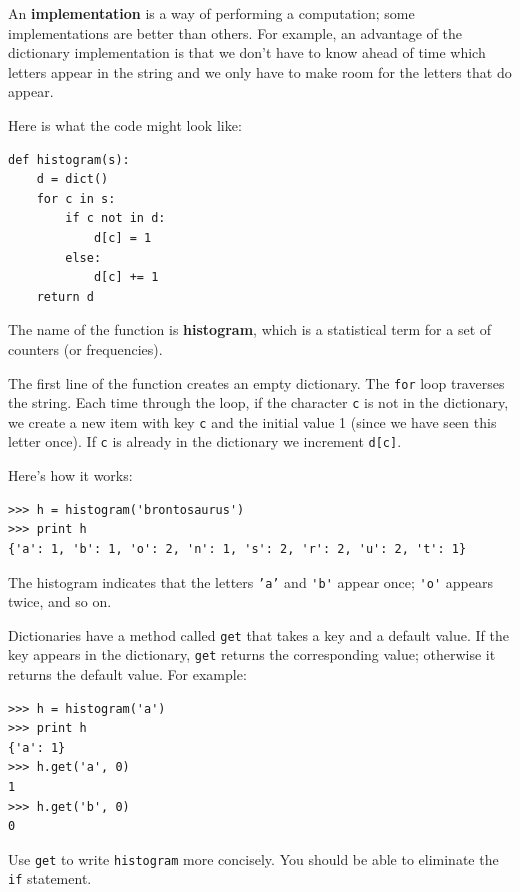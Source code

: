 \documentclass[10pt]{book}
\begin{document}
An {\bf implementation} is a way of performing a computation;
some implementations are better than others.  For example,
an advantage of the dictionary implementation is that we don't
have to know ahead of time which letters appear in the string
and we only have to make room for the letters that do appear.

Here is what the code might look like:

\beforeverb
\begin{verbatim}
def histogram(s):
    d = dict()
    for c in s:
        if c not in d:
            d[c] = 1
        else:
            d[c] += 1
    return d
\end{verbatim}
\afterverb
%
The name of the function is {\bf histogram}, which is a statistical
term for a set of counters (or frequencies).


The first line of the
function creates an empty dictionary.  The {\tt for} loop traverses
the string.  Each time through the loop, if the character {\tt c} is
not in the dictionary, we create a new item with key {\tt c} and the
initial value 1 (since we have seen this letter once).  If {\tt c} is
already in the dictionary we increment {\tt d[c]}.


Here's how it works:

\beforeverb
\begin{verbatim}
>>> h = histogram('brontosaurus')
>>> print h
{'a': 1, 'b': 1, 'o': 2, 'n': 1, 's': 2, 'r': 2, 'u': 2, 't': 1}
\end{verbatim}
\afterverb
%
The histogram indicates that the letters {\tt 'a'} and \verb"'b'"
appear once; \verb"'o'" appears twice, and so on.

\begin{ex}


Dictionaries have a method called {\tt get} that takes a key
and a default value.  If the key appears in the dictionary,
{\tt get} returns the corresponding value; otherwise it returns
the default value.  For example:

\beforeverb
\begin{verbatim}
>>> h = histogram('a')
>>> print h
{'a': 1}
>>> h.get('a', 0)
1
>>> h.get('b', 0)
0
\end{verbatim}
\afterverb
%
Use {\tt get} to write {\tt histogram} more concisely.  You
should be able to eliminate the {\tt if} statement.
\end{ex}
\end{document}
